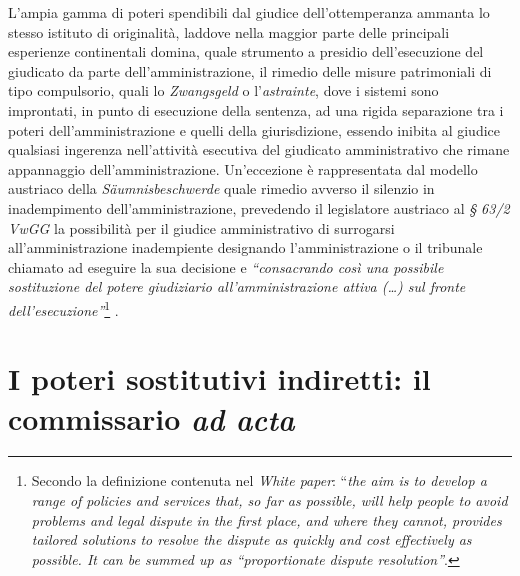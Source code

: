 \documentclass[12pt,it,a4paper,]{report}
\begin{document}
L'ampia gamma di poteri spendibili dal giudice dell'ottemperanza ammanta
lo stesso istituto di originalità, laddove nella maggior parte delle
principali esperienze continentali domina, quale strumento a presidio
dell'esecuzione del giudicato da parte dell'amministrazione, il rimedio
delle misure patrimoniali di tipo compulsorio, quali lo
\emph{Zwangsgeld} o l'\emph{astrainte}, dove i sistemi sono improntati,
in punto di esecuzione della sentenza, ad una rigida separazione tra i
poteri dell'amministrazione e quelli della giurisdizione, essendo
inibita al giudice qualsiasi ingerenza nell'attività esecutiva del
giudicato amministrativo che rimane appannaggio dell'amministrazione.
Un'eccezione è rappresentata dal modello austriaco della
\emph{Säumnisbeschwerde} quale rimedio avverso il silenzio in
inadempimento dell'amministrazione, prevedendo il legislatore austriaco
al \emph{§ 63/2 VwGG} la possibilità per il giudice amministrativo di
surrogarsi all'amministrazione inadempiente designando l'amministrazione
o il tribunale chiamato ad eseguire la sua decisione e
\emph{``consacrando così una possibile sostituzione del potere
giudiziario all'amministrazione attiva (\ldots) sul fronte
dell'esecuzione''}\footnote{Secondo la definizione contenuta nel
  \emph{White paper}: ``\emph{the aim is to develop a range of policies
  and services that, so far as possible, will help people to avoid
  problems and legal dispute in the first place, and where they cannot,
  provides tailored solutions to resolve the dispute as quickly and cost
  effectively as possible. It can be summed up as ``proportionate
  dispute resolution''}.} .

\hypertarget{i-poteri-sostitutivi-indiretti-il-commissario-ad-acta}{%
\section{\texorpdfstring{I poteri sostitutivi indiretti: il commissario
\emph{ad
acta}}{I poteri sostitutivi indiretti: il commissario ad acta}}\label{i-poteri-sostitutivi-indiretti-il-commissario-ad-acta}}
\end{document}
